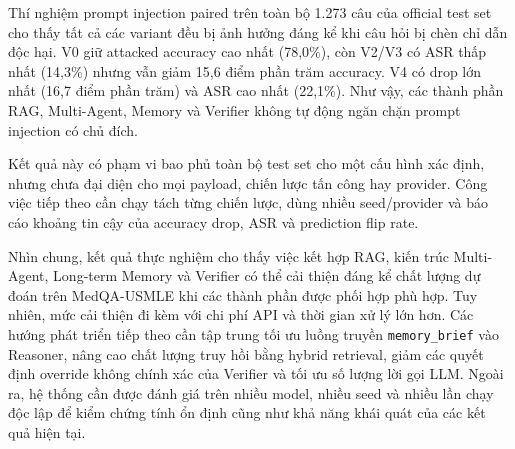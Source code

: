 Thí nghiệm prompt injection paired trên toàn bộ 1.273 câu của official test
set cho thấy tất cả các variant đều bị ảnh hưởng đáng kể khi câu hỏi bị chèn
chỉ dẫn độc hại. V0 giữ attacked accuracy cao nhất (78,0\%), còn V2/V3 có
ASR thấp nhất (14,3\%) nhưng vẫn giảm 15,6 điểm phần trăm accuracy. V4 có
drop lớn nhất (16,7 điểm phần trăm) và ASR cao nhất (22,1\%). Như vậy, các
thành phần RAG, Multi-Agent, Memory và Verifier không tự động ngăn chặn
prompt injection có chủ đích.

Kết quả này có phạm vi bao phủ toàn bộ test set cho một cấu hình xác định,
nhưng chưa đại diện cho mọi payload, chiến lược tấn công hay provider. Công
việc tiếp theo cần chạy tách từng chiến lược, dùng nhiều seed/provider và
báo cáo khoảng tin cậy của accuracy drop, ASR và prediction flip rate.

Nhìn chung, kết quả thực nghiệm cho thấy việc kết hợp RAG, kiến trúc
Multi-Agent, Long-term Memory và Verifier có thể cải thiện đáng kể
chất lượng dự đoán trên MedQA-USMLE khi các thành phần được phối hợp
phù hợp. Tuy nhiên, mức cải thiện đi kèm với chi phí API và thời gian
xử lý lớn hơn. Các hướng phát triển tiếp theo cần tập trung tối ưu
luồng truyền \texttt{memory\_brief} vào Reasoner, nâng cao chất lượng
truy hồi bằng hybrid retrieval, giảm các quyết định override không
chính xác của Verifier và tối ưu số lượng lời gọi LLM. Ngoài ra, hệ
thống cần được đánh giá trên nhiều model, nhiều seed và nhiều lần
chạy độc lập để kiểm chứng tính ổn định cũng như khả năng khái quát
của các kết quả hiện tại.

